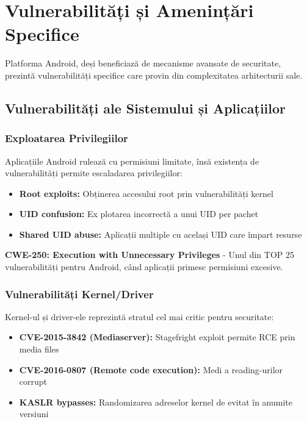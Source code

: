 \documentclass[11pt,a4paper,twocolumn]{article}
\theoremstyle{definition}
\theoremstyle{plain}
\theoremstyle{remark}
\begin{document}
\section{Vulnerabilități și Amenințări Specifice}

Platforma Android, deși beneficiază de mecanisme avansate de securitate, prezintă 
vulnerabilități specifice care provin din complexitatea arhitecturii sale.

\subsection{Vulnerabilități ale Sistemului și Aplicațiilor}

\subsubsection{Exploatarea Privilegiilor}
Aplicațiile Android rulează cu permisiuni limitate, însă existența de vulnerabilități 
permite escaladarea privilegiilor:
\begin{itemize}
    \item \textbf{Root exploits:} Obținerea accesului root prin vulnerabilități kernel
    \item \textbf{UID confusion:} Ex plotarea incorrectă a unui UID per pachet
    \item \textbf{Shared UID abuse:} Aplicații multiple cu același UID care împart resurse
\end{itemize}

\textbf{CWE-250: Execution with Unnecessary Privileges} - Unul din TOP 25 vulnerabilități 
pentru Android, când aplicații primesc permisiuni excesive.

\subsubsection{Vulnerabilități Kernel/Driver}
Kernel-ul și driver-ele reprezintă stratul cel mai critic pentru securitate:
\begin{itemize}
    \item \textbf{CVE-2015-3842 (Mediaserver):} Stagefright exploit permite RCE prin media files
    \item \textbf{CVE-2016-0807 (Remote code execution):} Medi a reading-urilor corrupt
    \item \textbf{KASLR bypasses:} Randomizarea adreselor kernel de evitat în anumite versiuni
\end{itemize}
\end{document}
